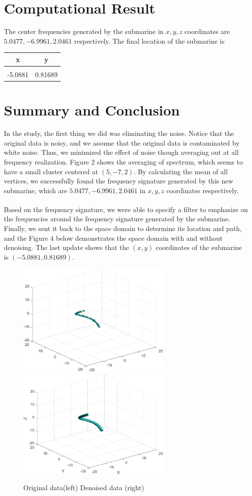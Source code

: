 \documentclass{article}
\begin{document}
\section{Computational Result}
The center frequencies generated by the submarine in $x, y, z$ coordinates are $5.0477, -6.9961, 2.0461$ respectively.
The final location of the submarine is
\begin{center}
    \begin{tabular}{ c c}
        x & y \\
        \hline\hline\\
        -5.0881 & 0.81689   
    \end{tabular}
\end{center}

\section{Summary and Conclusion}
In the study, the first thing we did was eliminating the noise. Notice that the original data is noisy, and we assume that the original data is contaminated by white noise. Thus, we minimized the effect of noise though averaging out at all frequency realization. Figure 2 shows the averaging of spectrum, which seems to have a small cluster centered at $(5, -7, 2)$. By calculating the mean of all vertices, we successfully found the frequency signature generated by this new submarine, which are $5.0477, -6.9961, 2.0461$ in $x,y,z$ coordinates respectively. \\
~\\
Based on the frequency signature, we were able to specify a filter to emphasize on the frequencies around the frequency signature generated by the submarine. Finally, we sent it back to the space domain to determine its location and path, and the Figure 4 below demonstrates the space domain with and without denoising. The last update shows that the $(x,y)$ coordinates of the submarine is $(-5.0881,0.81689)$. 
\begin{figure}[h]
    \centerline{\includegraphics[width=3in]{comp.png}\includegraphics[width=3in]{comp2.png}}
    \caption{Original data(left) \quad Denoised data (right)}
\end{figure}
\end{document}
